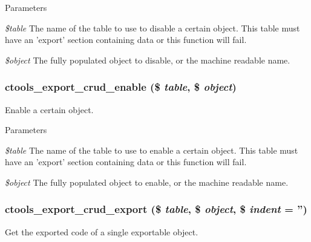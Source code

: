 \begin{DoxyParams}{Parameters}
\item[{\em \$table}]The name of the table to use to disable a certain object. This table must have an 'export' section containing data or this function will fail. \item[{\em \$object}]The fully populated object to disable, or the machine readable name. \end{DoxyParams}
\hypertarget{group__export__crud_gaf83f6d3c4b7d96b62ef7201de24ce0b7}{
\subsubsection[{ctools\_\-export\_\-crud\_\-enable}]{\setlength{\rightskip}{0pt plus 5cm}ctools\_\-export\_\-crud\_\-enable (\$ {\em table}, \/  \$ {\em object})}}
\label{group__export__crud_gaf83f6d3c4b7d96b62ef7201de24ce0b7}
Enable a certain object.


\begin{DoxyParams}{Parameters}
\item[{\em \$table}]The name of the table to use to enable a certain object. This table must have an 'export' section containing data or this function will fail. \item[{\em \$object}]The fully populated object to enable, or the machine readable name. \end{DoxyParams}
\hypertarget{group__export__crud_ga7c6ace5b3a936babe3394b02c5fa2f50}{
\subsubsection[{ctools\_\-export\_\-crud\_\-export}]{\setlength{\rightskip}{0pt plus 5cm}ctools\_\-export\_\-crud\_\-export (\$ {\em table}, \/  \$ {\em object}, \/  \$ {\em indent} = {\ttfamily ''})}}
\label{group__export__crud_ga7c6ace5b3a936babe3394b02c5fa2f50}
Get the exported code of a single exportable object.


